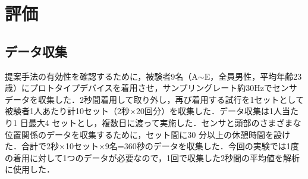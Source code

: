 \documentclass[Japanese,noauthor]{dicomopapers}
\begin{document}

\section{評価}
\label{evaluation}
\subsection{データ収集}
提案手法の有効性を確認するために，被験者9名（A$\sim$E，全員男性，平均年齢23歳）にプロトタイプデバイスを着用させ，サンプリングレート約30Hzでセンサデータを収集した．2秒間着用して取り外し，再び着用する試行を1セットとして被験者1人あたり計10セット（2秒$\times$20回分）を収集した．データ収集は1人当たり1 日最大4 セットとし，複数日に渡って実施した．センサと頭部のさまざまな位置関係のデータを収集するために，セット間に30 分以上の休憩時間を設けた．合計で2秒×10セット×9名=360秒のデータを収集した．今回の実験では1度の着用に対して1つのデータが必要なので，1回で収集した2秒間の平均値を解析に使用した．
\end{document}
